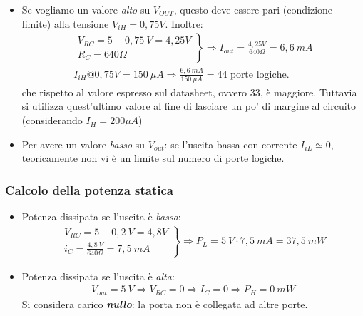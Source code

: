 \documentclass[
]{book}
\providecommand{\tightlist}{%
  \setlength{\itemsep}{0pt}\setlength{\parskip}{0pt}}
\begin{document}
\begin{itemize}
\tightlist
\item
  Se vogliamo un valore \emph{alto} su \(V_{OUT}\), questo deve essere
  pari (condizione limite) alla tensione \(V_{iH}=0,75V\). Inoltre:
  \begin{align*}
  \left. \begin{array}{l} 
  V_{RC}=5-0,75 \: V=4,25 V \\
  R_{C}=640\Omega
  \end{array} \right\} 
  \Longrightarrow 
  I_{out}=\frac{4,25V}{640\Omega}=6,6\:mA \\
  I_{iH}@0,75V=150\:\mu A \Longrightarrow \frac{6,6\:mA}{150\:\mu A}=44 \text{ porte logiche.}
  \end{align*} che rispetto al valore espresso sul datasheet, ovvero 33,
  è maggiore. Tuttavia si utilizza quest'ultimo valore al fine di
  lasciare un po' di margine al circuito (considerando \(I_H=200\mu A\))
\item
  Per avere un valore \emph{basso} su \(V_{out}\): se l'uscita bassa con
  corrente \(I_{iL}\simeq 0\), teoricamente non vi è un limite sul
  numero di porte logiche.
\end{itemize}

\subsubsection{Calcolo della potenza
statica}\label{calcolo-della-potenza-statica}

\begin{itemize}
\tightlist
\item
  Potenza dissipata se l'uscita è \emph{bassa}: \begin{align*}
  \left. \begin{array}{l} 
  V_{RC}=5-0,2 \: V=4,8 V \\
  i_{C}=\frac{4,8\:V}{640\Omega}=7,5\:mA
  \end{array} \right\} 
  \Longrightarrow 
  P_{L}=5\:V\cdot 7,5\:mA=37,5\:mW
  \end{align*}
\item
  Potenza dissipata se l'uscita è \emph{alta}: \begin{align*}
  V_{out}=5\:V\Longrightarrow V_{RC}=0\Longrightarrow I_{C}=0\Longrightarrow P_{H}=0\:mW
  \end{align*} Si considera carico \textbf{\emph{nullo}}: la porta non è
  collegata ad altre porte.
\end{itemize}
\end{document}
